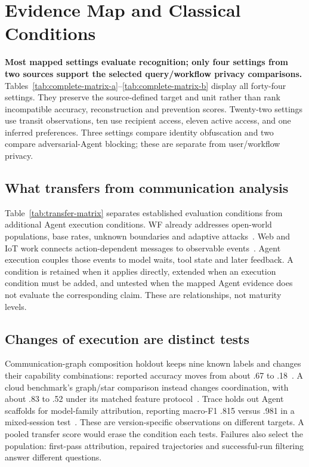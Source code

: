 \section{Evidence Map and Classical Conditions}\label{sec:correspondence}
\textbf{Most mapped settings evaluate recognition; only four settings from two sources support the selected query/workflow privacy comparisons.}
Tables~\ref{tab:complete-matrix-a}--\ref{tab:complete-matrix-b} display all forty-four settings. They preserve the source-defined target and unit rather than rank incompatible accuracy, reconstruction and prevention scores. Twenty-two settings use transit observations, ten use recipient access, eleven active access, and one inferred preferences. Three settings compare identity obfuscation and two compare adversarial-Agent blocking; these are separate from user/workflow privacy.




\subsection{What transfers from communication analysis}
Table~\ref{tab:transfer-matrix} separates established evaluation conditions from additional Agent execution conditions. WF already addresses open-world populations, base rates, unknown boundaries and adaptive attacks~\cite{juarez2014critical,wang2016realistic,guan2021bapm,deng2023ares,mathews2023critical}. Web and IoT work connects action-dependent messages to observable events~\cite{chen2010web,chapman2011blackbox,trimananda2020pingpong,ahmed2023voice}. Agent execution couples those events to model waits, tool state and later feedback. A condition is retained when it applies directly, extended when an execution condition must be added, and untested when the mapped Agent evidence does not evaluate the corresponding claim. These are relationships, not maturity levels.



\subsection{Changes of execution are distinct tests}
Communication-graph composition holdout keeps nine known labels and changes their capability combinations: reported accuracy moves from about .67 to .18~\cite{dangol2026workflow}. A cloud benchmark's graph/star comparison instead changes coordination, with about .83 to .52 under its matched feature protocol~\cite{pouryousef2026traffic}. Trace holds out Agent scaffolds for model-family attribution, reporting macro-F1 .815 versus .981 in a mixed-session test~\cite{ediga2026trace}. These are version-specific observations on different targets. A pooled transfer score would erase the condition each tests. Failures also select the population: first-pass attribution, repaired trajectories and successful-run filtering answer different questions.
